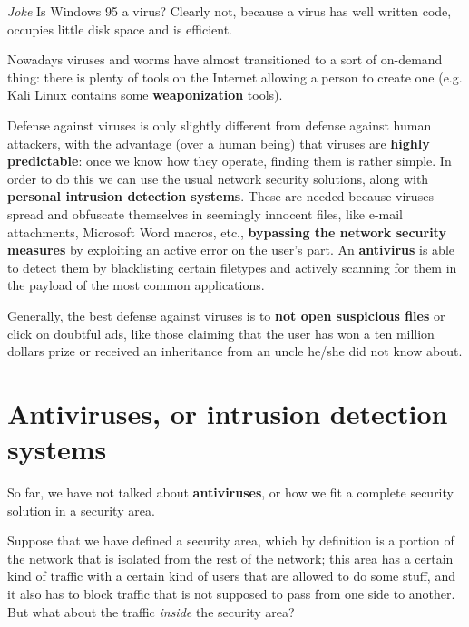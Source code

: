 \vspace{0.5em}

\emph{Joke} Is Windows 95 a virus? Clearly not, because a virus has well written code, occupies little disk space and is efficient.

\vspace{0.5em}

Nowadays viruses and worms have almost transitioned to a sort of on-demand thing: there is plenty of tools on the Internet allowing a person to create one (e.g. Kali Linux contains some \textbf{weaponization} tools).

Defense against viruses is only slightly different from defense against human attackers, with the advantage (over a human being) that viruses are \textbf{highly predictable}: once we know how they operate, finding them is rather simple. In order to do this we can use the usual network security solutions, along with \textbf{personal intrusion detection systems}. These are needed because viruses spread and obfuscate themselves in seemingly innocent files, like e-mail attachments, Microsoft Word macros, etc., \textbf{bypassing the network security measures} by exploiting an active error on the user’s part. An \textbf{antivirus} is able to detect them by blacklisting certain filetypes and actively scanning for them in the payload of the most common applications.

Generally, the best defense against viruses is to \textbf{not open suspicious files} or click on doubtful ads, like those claiming that the user has won a ten million dollars prize or received an inheritance from an uncle he/she did not know about.


\section{Antiviruses, or intrusion detection systems}
So far, we have not talked about \textbf{antiviruses}, or how we fit a complete security solution in a security area.

Suppose that we have defined a security area, which by definition is a portion of the network that is isolated from the rest of the network; this area has a certain kind of traffic with a certain kind of users that are allowed to do some stuff, and it also has to block traffic that is not supposed to pass from one side to another. But what about the traffic \textit{inside} the security area?

